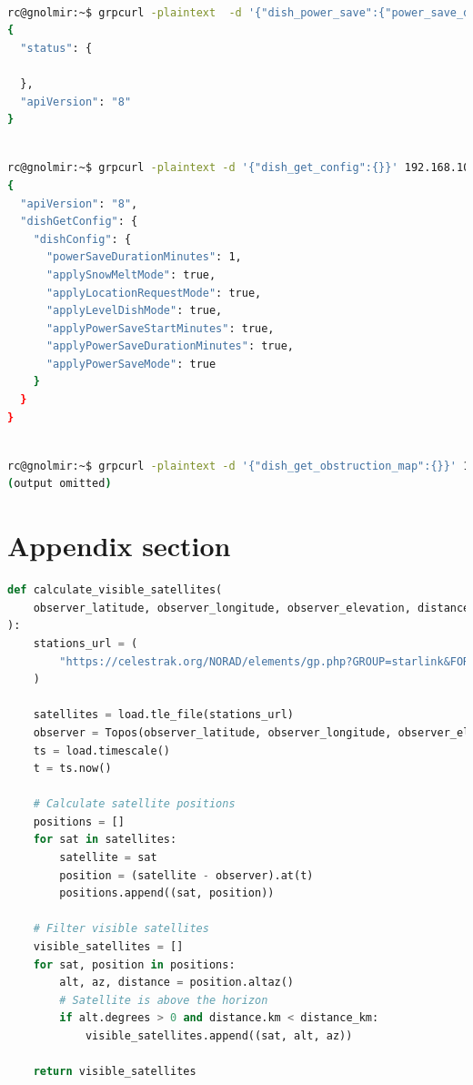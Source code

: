\documentclass[IN,11pt,twoside,openright,bachelor,english]{tumthesis}
\begin{document}
\begin{lstlisting}[language=bash,basicstyle=\tiny]

rc@gnolmir:~$ grpcurl -plaintext  -d '{"dish_power_save":{"power_save_duration_minutes":1}}' 192.168.100.1:9200 SpaceX.API.Device.Device/Handle
{
  "status": {
    
  },
  "apiVersion": "8"
}
\end{lstlisting}
\begin{lstlisting}[language=bash,basicstyle=\tiny]

rc@gnolmir:~$ grpcurl -plaintext -d '{"dish_get_config":{}}' 192.168.100.1:9200 SpaceX.API.Device.Device/Handle
{
  "apiVersion": "8",
  "dishGetConfig": {
    "dishConfig": {
      "powerSaveDurationMinutes": 1,
      "applySnowMeltMode": true,
      "applyLocationRequestMode": true,
      "applyLevelDishMode": true,
      "applyPowerSaveStartMinutes": true,
      "applyPowerSaveDurationMinutes": true,
      "applyPowerSaveMode": true
    }
  }
}
\end{lstlisting}
\begin{lstlisting}[language=bash,basicstyle=\tiny]

rc@gnolmir:~$ grpcurl -plaintext -d '{"dish_get_obstruction_map":{}}' 192.168.100.1:9200 SpaceX.API.Device.Device/Handle
(output omitted)
\end{lstlisting}
\section{Appendix section}

\begin{lstlisting}[language=python,caption={the \texttt{calculate\_visible\_satellites} function},captionpos=b]
def calculate_visible_satellites(
    observer_latitude, observer_longitude, observer_elevation, distance_km
):
    stations_url = (
        "https://celestrak.org/NORAD/elements/gp.php?GROUP=starlink&FORMAT=tle"
    )

    satellites = load.tle_file(stations_url)
    observer = Topos(observer_latitude, observer_longitude, observer_elevation)
    ts = load.timescale()
    t = ts.now()

    # Calculate satellite positions
    positions = []
    for sat in satellites:
        satellite = sat
        position = (satellite - observer).at(t)
        positions.append((sat, position))

    # Filter visible satellites
    visible_satellites = []
    for sat, position in positions:
        alt, az, distance = position.altaz()
        # Satellite is above the horizon
        if alt.degrees > 0 and distance.km < distance_km:
            visible_satellites.append((sat, alt, az))

    return visible_satellites
\end{lstlisting}

\clearpage
\pagestyle{thesischapter}

\cleardoublepage
{}

\printbibliography[heading=bibintoc]
\clearpage
\pagestyle{empty}
\end{document}
